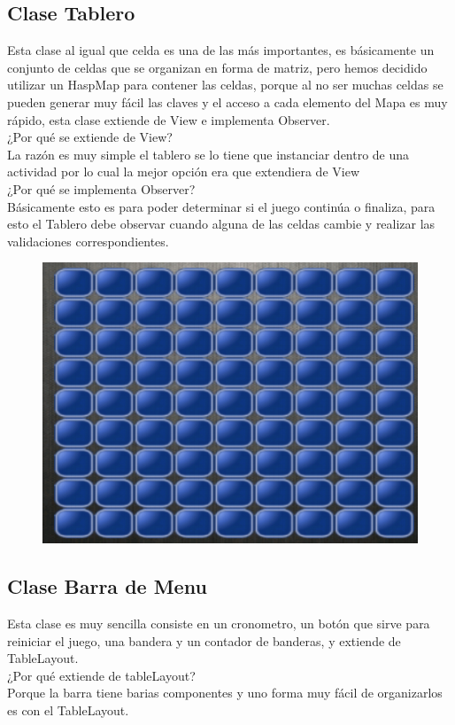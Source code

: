 \documentclass[11pt]{article} %
\begin{document}
\subsection{Clase Tablero}
Esta clase al igual que celda es una de las más importantes, es básicamente un conjunto de celdas que se organizan en forma de matriz, pero hemos decidido utilizar un HaspMap para contener las celdas, porque al no ser muchas celdas se pueden generar muy fácil las claves y el acceso a cada elemento del Mapa es muy rápido, esta clase extiende de View e implementa Observer.\\
¿Por qué se extiende de View?\\
La razón es muy simple el tablero se lo tiene que instanciar dentro de una actividad por lo cual la mejor opción era que extendiera de View\\
¿Por qué se implementa Observer?\\
Básicamente esto es para poder determinar si el juego continúa o finaliza, para esto el Tablero debe observar cuando alguna de las celdas cambie y realizar las validaciones correspondientes.\\

\begin{figure}[H]
 \begin{center}
    \includegraphics{imagenes_Documentacion/tablero}
\end{center}
\caption {}
\label{Tablero}
\end{figure}


\subsection{Clase Barra de Menu}
Esta clase es muy sencilla consiste en un cronometro, un botón que sirve para reiniciar el juego, una bandera y un contador de banderas, y extiende de TableLayout.\\
¿Por qué extiende de tableLayout?\\
Porque la barra tiene barias componentes y uno forma muy fácil de organizarlos es con el TableLayout.\\
\end{document}
